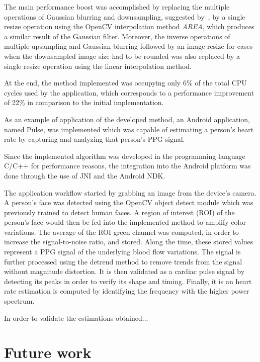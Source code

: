 The main performance boost was accomplished by replacing the multiple
operations of Gaussian blurring and downsampling, suggested
by~\cite{Wu2012Eulerian}, by a single resize operation using the OpenCV
interpolation method \emph{AREA}, which produces a similar result of the
Gaussian filter. Moreover, the inverse operations of multiple
upsampling and Gaussian blurring followed by an image resize
for cases when the downsampled image size had to be rounded was also
replaced by a single resize operation using the linear interpolation method.

At the end, the \evm{} method implemented was occupying only 6\% of the total
CPU cycles used by the application, which corresponds to a performance
improvement of 22\% in comparison to the initial implementation.

As an example of application of the developed \evm{} method, an Android
application, named Pulse, was implemented which was capable of estimating a
person's heart rate by capturing and analyzing that person's PPG signal.

Since the implemented algorithm was developed in the programming language
C/C++ for performance reasons, the integration into the Android platform
was done through the use of JNI and the Android NDK.

The application workflow started by grabbing an image from the device's
camera. A person's face was detected using the OpenCV object detect module
which was previously trained to detect human faces. A region of interest (ROI)
of the person's face would then be fed into the implemented \evm{} method to
amplify color variations. The average of the ROI green channel was computed,
in order to increase the signal-to-noise ratio, and stored. Along the time,
these stored values represent a PPG signal of the underlying blood flow
variations. The signal is further processed using the detrend method
to remove trends from the signal without magnitude distortion. It is then
validated as a cardiac pulse signal by detecting its peaks in order to
verify its shape and timing. Finally, it is an heart rate estimation is
computed by identifying the frequency with the higher power spectrum.

In order to validate the estimations obtained...

\section{Future work} \label{sec:conclusions:future}

